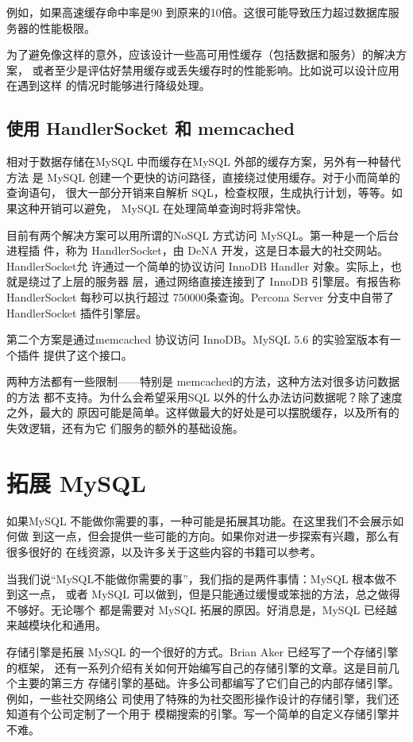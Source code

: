 例如，如果高速缓存命中率是90%
到原来的10倍。这很可能导致压力超过数据库服务器的性能极限。

为了避免像这样的意外，应该设计一些高可用性缓存（包括数据和服务）的解决方案，
或者至少是评估好禁用缓存或丢失缓存时的性能影响。比如说可以设计应用在遇到这样
的情况时能够进行降级处理。

\subsection{使用 HandlerSocket 和 memcached}
相对于数据存储在MySQL 中而缓存在MySQL 外部的缓存方案，另外有一种替代方法
是 MySQL 创建一个更快的访问路径，直接绕过使用缓存。对于小而简单的查询语句，
很大一部分开销来自解析 SQL，检查权限，生成执行计划，等等。如果这种开销可以避免，
MySQL 在处理简单查询时将非常快。

目前有两个解决方案可以用所谓的NoSQL 方式访问 MySQL。第一种是一个后台进程插
件，称为 HandlerSocket，由 DeNA 开发，这是日本最大的社交网站。HandlerSocket允
许通过一个简单的协议访问 InnoDB Handler 对象。实际上，也就是绕过了上层的服务器
层，通过网络直接连接到了 InnoDB 引擎层。有报告称 HandlerSocket 每秒可以执行超过
750000条查询。Percona Server 分支中自带了HandlerSocket 插件引擎层。

第二个方案是通过memcached 协议访问 InnoDB。MySQL 5.6 的实验室版本有一个插件
提供了这个接口。

两种方法都有一些限制——特别是 memcached的方法，这种方法对很多访问数据的方法
都不支持。为什么会希望采用SQL 以外的什么办法访问数据呢？除了速度之外，最大的
原因可能是简单。这样做最大的好处是可以摆脱缓存，以及所有的失效逻辑，还有为它
们服务的额外的基础设施。

\section{拓展 MySQL}
如果MySQL 不能做你需要的事，一种可能是拓展其功能。在这里我们不会展示如何做
到这一点，但会提供一些可能的方向。如果你对进一步探索有兴趣，那么有很多很好的
在线资源，以及许多关于这些内容的书籍可以参考。

当我们说“MySQL不能做你需要的事”，我们指的是两件事情：MySQL 根本做不到这一点，
或者 MySQL 可以做到，但是只能通过缓慢或笨拙的方法，总之做得不够好。无论哪个
都是需要对 MySQL 拓展的原因。好消息是，MySQL 已经越来越模块化和通用。

存储引擎是拓展 MySQL 的一个很好的方式。Brian Aker 已经写了一个存储引擎的框架，
还有一系列介绍有关如何开始编写自己的存储引擎的文章。这是目前几个主要的第三方
存储引擎的基础。许多公司都编写了它们自己的内部存储引擎。例如，一些社交网络公
司使用了特殊的为社交图形操作设计的存储引擎，我们还知道有个公司定制了一个用于
模糊搜索的引擎。写一个简单的自定义存储引擎并不难。

